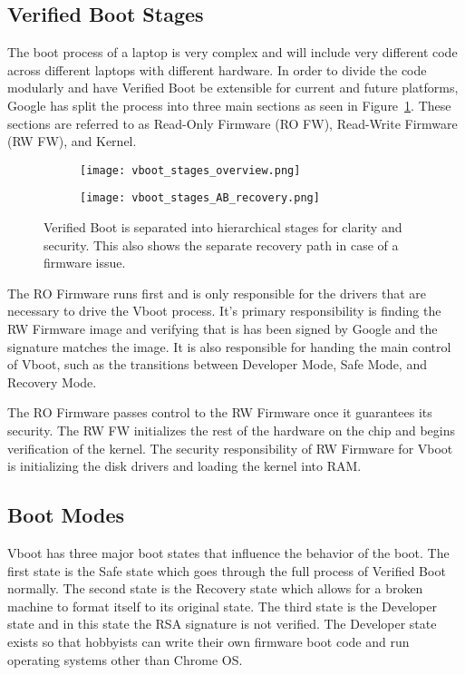 \documentclass[../report.tex]{subfiles}
\begin{document}
\subsection{Verified Boot Stages}

The boot process of a laptop is very complex and will include very different code across different laptops with different hardware.
In order to divide the code modularly and have Verified Boot be extensible for current and future platforms, Google has split the process into three main sections as seen in Figure~\ref{fig:vboot_stages_overview}.
These sections are referred to as Read-Only Firmware (RO FW), Read-Write Firmware (RW FW), and Kernel.

\begin{figure}
\begin{subfigure}{.4\textwidth}
  \centering
  \texttt{[image: vboot\_stages\_overview.png]}
\end{subfigure}
\begin{subfigure}{.60\textwidth}
  \centering
  \texttt{[image: vboot\_stages\_AB\_recovery.png]}
\end{subfigure}
\caption{Verified Boot is separated into hierarchical stages for clarity and security. This also shows the separate recovery path in case of a firmware issue.}
\label{fig:vboot_stages_overview}
\end{figure}

The RO Firmware runs first and is only responsible for the drivers that are necessary to drive the Vboot process. 
It's primary responsibility is finding the RW Firmware image and verifying that is has been signed by Google and the signature matches the image.
It is also responsible for handing the main control of Vboot, such as the transitions between Developer Mode, Safe Mode, and Recovery Mode.

The RO Firmware passes control to the RW Firmware once it guarantees its security.
The RW FW initializes the rest of the hardware on the chip and begins verification of the kernel.
The security responsibility of RW Firmware for Vboot is initializing the disk drivers and loading the kernel into RAM\@.

\subsection{Boot Modes}\label{sec:boot-modes}

Vboot has three major boot states that influence the behavior of the boot. 
The first state is the Safe state which goes through the full process of Verified Boot normally.
The second state is the Recovery state which allows for a broken machine to format itself to its original state.
The third state is the Developer state and in this state the RSA signature is not verified.
The Developer state exists so that hobbyists can write their own firmware boot code and run operating systems other than Chrome OS\@.
\end{document}
